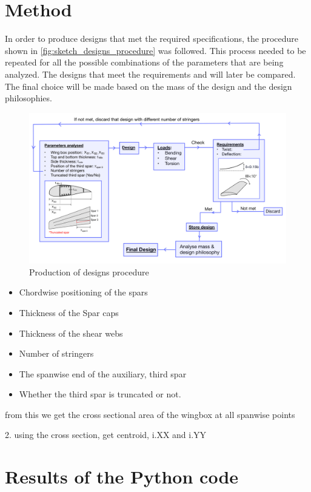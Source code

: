 \section{Method}
In order to produce designs that met the required specifications, the procedure shown in \autoref{fig:sketch_designs_procedure} was followed. This process needed to be repeated for all the possible combinations of the parameters that are being analyzed. The designs that meet the requirements and will later be compared. The final choice will be made based on the mass of the design and the design philosophies.

\begin{figure}[H]
    \centering
    \includegraphics[width=1.1\linewidth]{figures/diagram python code.jpeg}
    \caption{Production of designs procedure}
    \label{fig:sketch_designs_procedure}
\end{figure}

\begin{itemize}
    \item Chordwise positioning of the spars 
    \item Thickness of the Spar caps 
    \item Thickness of the shear webs 
    \item Number of stringers 
    \item The spanwise end of the auxiliary, third spar 
    \item Whether the third spar is truncated or not. 
\end{itemize}
    from this we get the cross sectional area of the wingbox at all spanwise points

    2. using the cross section, get centroid, i.XX and i.YY 

    
\section{Results of the Python code}